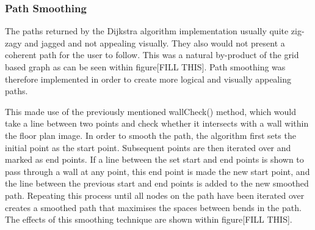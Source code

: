 \documentclass[main.tex]{subfiles}
\begin{document}
\subsubsection{Path Smoothing}

The paths returned by the Dijkstra algorithm implementation usually quite zig-zagy and jagged and not appealing visually. They also would not present a coherent path for the user to follow. This was a natural by-product of the grid based graph as can be seen within figure[FILL THIS]. Path smoothing was therefore implemented in order to create more logical and visually appealing paths.

This made use of the previously mentioned wallCheck() method, which would take a line between two points and check whether it intersects with a wall within the floor plan image. In order to smooth the path, the algorithm first sets the initial point as the start point. Subsequent points are then iterated over and marked as end points. If a line between the set start and end points is shown to pass through a wall at any point, this end point is made the new start point, and the line between the previous start and end points is added to the new smoothed path. Repeating this process until all nodes on the path have been iterated over creates a smoothed path that maximises the spaces between bends in the path. The effects of this smoothing technique are shown within figure[FILL THIS].
\end{document}
